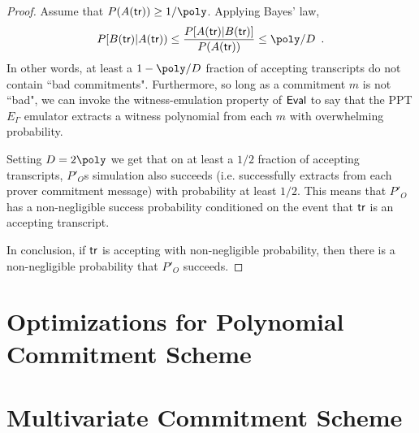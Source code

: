 \begin{proof}
Assume that $P(A(\tr)) \geq 1/\poly$. Applying Bayes' law, %
\[ P[B(\tr) | A(\tr)) \leq \frac{ P[A(\tr) | B(\tr)] }{ P(A(\tr)) } \leq \poly / D \enspace . \]
In other words, at least a $1 - \poly/D$ fraction of accepting transcripts do not contain ``bad commitments". %
Furthermore, so long as a commitment $m$ is not ``bad", we can invoke the witness-emulation property of $\textsf{{Eval}}$ to say that the PPT $E_\Gamma$ emulator extracts a witness polynomial from each $m$ with overwhelming probability.


Setting $D = 2 \poly$ we get that on at least a $1/2$ fraction of accepting transcripts, $P'_O$s simulation also succeeds (i.e. successfully extracts from each prover commitment message) with probability at least $1/2$. This means that $P'_O$ has a non-negligible success probability conditioned on the event that $\textsf{{tr}}$ is an accepting transcript. 

In conclusion, if $\textsf{{tr}}$ is accepting with non-negligible probability, then there is a non-negligible probability that $P'_O$ succeeds. 
\end{proof}

\ifappendix

\section{Optimizations for Polynomial Commitment Scheme}
\label{subsec:optimization}

\section{Multivariate Commitment Scheme}
\label{sec:multivariate}


\fi


%


